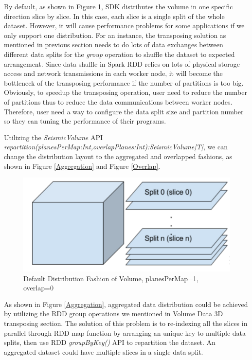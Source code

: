 By default, as shown in Figure \ref{DefDist}, SDK distributes the volume in one specific direction slice by slice. In this case, each slice is a single split of the whole dataset. However, it will cause performance problems for some applications if we only support one distribution. For an instance, the transposing solution as mentioned in previous section needs to do lots of data exchanges between different data splits for the \emph{group} operation to shuffle the dataset to expected arrangement. Since data shuffle in Spark RDD relies on lots of physical storage access and network transmissions in each worker node, it will become the bottleneck of the transposing performance if the number of partitions is too big. Obviously, to speedup the transposing operation, user need to reduce the number of partitions thus to reduce the data communications between worker nodes. Therefore, user need a way to configure the data split size and partition number so they can tuning the performance of their programs.

Utilizing the \emph{SeismicVolume} API \emph{repartition(planesPerMap:Int,overlapPlanes:Int):SeismicVolume[T]}, we can change the distribution layout to the aggregated and overlapped fashions, as shown in Figure \ref{Aggregation} and Figure \ref{Overlap}.

\begin{figure}[h]
\centering
\includegraphics[scale=0.6]{figures/DefDist.png}
\caption{Default Distribution Fashion of Volume, planesPerMap=1, overlap=0}
\label{DefDist}
\end{figure}

As shown in Figure \ref{Aggregation}, aggregated data distribution could be achieved by utilizing the RDD group operations we mentioned in Volume Data 3D transposing section. The solution of this problem is to re-indexing all the slices in parallel through RDD map function by arranging an unique key to multiple data splits, then use RDD \emph{groupByKey()} API to repartition the dataset. An aggregated dataset could have multiple slices in a single data split.

